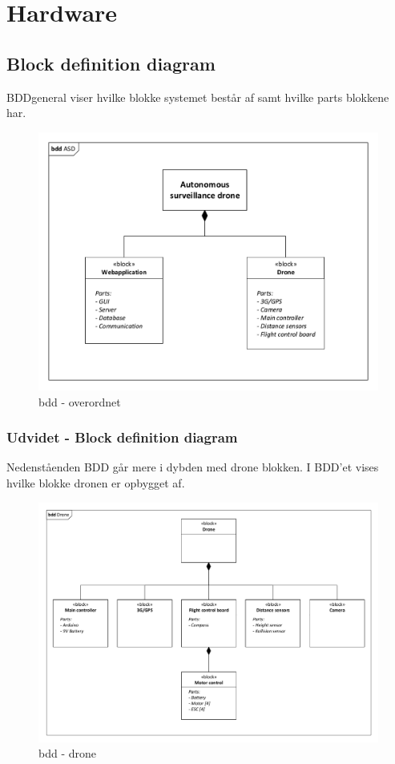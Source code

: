 \section{Hardware}

\subsection{Block definition diagram}
BDD\textunderscore general viser hvilke blokke systemet består af samt hvilke parts blokkene har.


\begin{figure}[H]
\centering
\includegraphics[width=1\textwidth]{Billeder/BDD/bdd_overordnet.pdf}
\caption{bdd - overordnet}
\label{fig:bdd_overordnet}
\end{figure}

\subsubsection{Udvidet - Block definition diagram}
Nedenståenden BDD går mere i dybden med drone blokken. I BDD'et vises hvilke blokke dronen er opbygget af.

\begin{figure}[H]
\centering
\includegraphics[width=1\textwidth]{Billeder/BDD/bdd_drone.pdf}
\caption{bdd - drone}
\label{fig:bdd_drone}
\end{figure}


